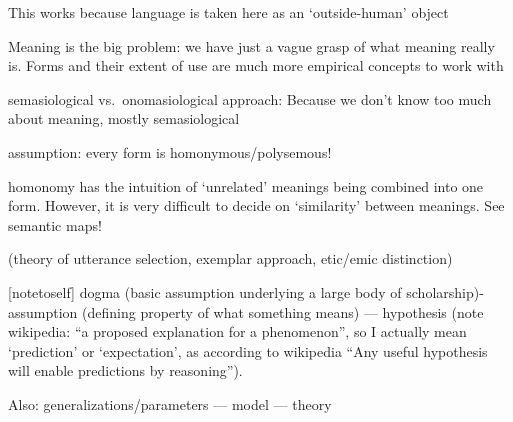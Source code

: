 This works because language is taken here as an `outside-human' object

Meaning is the big problem: we have just a vague grasp of what meaning really is. Forms and their extent of use are much more empirical concepts to work with

semasiological vs.~onomasiological approach: Because we don't know too much about meaning, mostly semasiological


%
assumption: every form is homonymous/polysemous!

homonomy has the intuition of `unrelated' meanings being combined into one form. However, it is very difficult to decide on `similarity' between meanings. See semantic maps!

(theory of utterance selection, exemplar approach, etic/emic distinction)

[notetoself] dogma (basic assumption underlying a large body of scholarship)- assumption (defining property of what something means) --- hypothesis (note wikipedia: ``a proposed explanation for a phenomenon'', so I actually mean `prediction' or `expectation', as according to wikipedia ``Any useful hypothesis will enable predictions by reasoning'').

Also: generalizations/parameters --- model --- theory 
